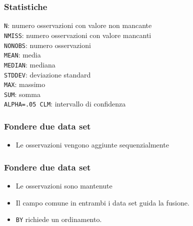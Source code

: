\begin{frame}\frametitle{Statistiche}
  \texttt{N}: numero osservazioni con valore non mancante\\
  \texttt{NMISS}: numero osservazioni con valore mancanti\\
  \texttt{NONOBS}: numero osservazioni\\
  \texttt{MEAN}: media\\
  \texttt{MEDIAN}: mediana\\
  \texttt{STDDEV}: deviazione standard\\
  \texttt{MAX}: massimo\\
  \texttt{SUM}: somma\\
  \texttt{ALPHA=.05 CLM}: intervallo di confidenza\\
\end{frame}


\begin{frame}[containsverbatim]\frametitle{Fondere due data set}
  \begin{itemize}
  \item
    Le osservazioni vengono aggiunte sequenzialmente
  \end{itemize}
\end{frame}



\begin{frame}[containsverbatim]\frametitle{Fondere due data set}
  \begin{itemize}
  \item
    Le osservazioni sono mantenute
  \item
    Il campo comune in entrambi i data set guida la fusione.
  \item
    \verb+BY+ richiede un ordinamento.
  \end{itemize}
\end{frame}










